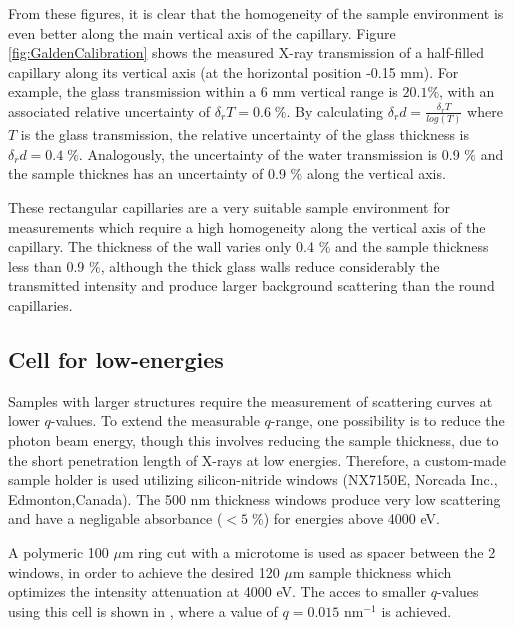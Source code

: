 From these figures, it is clear that the homogeneity of the sample environment is even better along the main vertical axis of the capillary. Figure \ref{fig:GaldenCalibration} shows the measured X-ray transmission of a half-filled capillary along its vertical axis (at the horizontal position -0.15 mm). For example, the glass transmission within a 6 mm vertical range is $20.1\%$, with an associated relative uncertainty of $\delta_r T =0.6 \; \%$. By calculating $\delta_r d = \frac{\delta_r T}{log(T)}$ where $T$ is the glass transmission, the relative uncertainty of the glass thickness is $\delta_r d = 0.4 \; \%$. Analogously, the uncertainty of the water transmission is 0.9 $\%$ and the sample thicknes has an uncertainty of 0.9 $\%$ along the vertical axis.

These rectangular capillaries are a very suitable sample environment for measurements which require a high homogeneity along the vertical axis of the capillary. The thickness of the wall varies only 0.4 $\%$ and the sample thickness less than 0.9 $\%$, although the thick glass walls reduce considerably the transmitted intensity and produce larger background scattering than the round capillaries.

\subsection{Cell for low-energies}

Samples with larger structures require the measurement of scattering curves at lower $q$-values. To extend the measurable $q$-range, one possibility is to reduce the photon beam energy, though this involves reducing the sample thickness, due to the short penetration length of X-rays at low energies. Therefore, a custom-made sample holder is used utilizing silicon-nitride windows (NX7150E, Norcada Inc., Edmonton,Canada). The 500 nm thickness windows produce very low scattering and have a negligable absorbance ($<5\;\%$) for energies above 4000 eV.

A polymeric 100 $\mu$m ring cut with a microtome is used as spacer between the 2 windows, in order to achieve the desired 120 $\mu$m sample thickness which optimizes the intensity attenuation at 4000 eV. The acces to smaller $q$-values using this cell is shown in \cite{varga_towards_2014}, where a value of $q=0.015$ nm$^{-1}$ is achieved.

